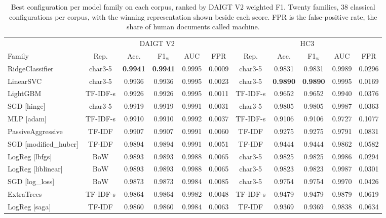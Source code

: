 \documentclass[conference,a4paper]{IEEEtran}
\begin{document}
\begin{table}[!t]
\centering
\caption{Best configuration per model family on each corpus, ranked by DAIGT V2 weighted F1. Twenty families, 38 classical configurations per corpus, with the winning representation shown beside each score. FPR is the false-positive rate, the share of human documents called machine.}
\label{tab:families}
\footnotesize
\setlength{\tabcolsep}{4pt}
\begin{tabular}{@{}lccccc@{\hspace{10pt}}ccccc@{}}
\toprule
& \multicolumn{5}{c}{DAIGT V2} & \multicolumn{5}{c}{HC3} \\
\cmidrule(lr){2-6}\cmidrule(lr){7-11}
Family & Rep. & Acc. & F1$_\mathrm{w}$ & AUC & FPR & Rep. & Acc. & F1$_\mathrm{w}$ & AUC & FPR \\
\midrule
RidgeClassifier & char3-5 & \textbf{0.9941} & \textbf{0.9941} & 0.9995 & 0.0009 & char3-5 & 0.9831 & 0.9831 & 0.9989 & 0.0296 \\
LinearSVC & char3-5 & 0.9936 & 0.9936 & 0.9995 & 0.0023 & char3-5 & \textbf{0.9890} & \textbf{0.9890} & 0.9995 & 0.0169 \\
LightGBM & TF-IDF-s & 0.9926 & 0.9926 & 0.9995 & 0.0011 & TF-IDF-s & 0.9652 & 0.9652 & 0.9940 & 0.0376 \\
SGD [hinge] & char3-5 & 0.9919 & 0.9919 & 0.9991 & 0.0031 & char3-5 & 0.9805 & 0.9805 & 0.9987 & 0.0363 \\
MLP [adam] & TF-IDF-s & 0.9910 & 0.9910 & 0.9992 & 0.0037 & TF-IDF-s & 0.9106 & 0.9106 & 0.9727 & 0.1077 \\
PassiveAggressive & TF-IDF & 0.9907 & 0.9907 & 0.9991 & 0.0060 & TF-IDF & 0.9275 & 0.9275 & 0.9791 & 0.0831 \\
SGD [modified\_huber] & TF-IDF & 0.9894 & 0.9894 & 0.9991 & 0.0051 & TF-IDF & 0.9444 & 0.9444 & 0.9862 & 0.0582 \\
LogReg [lbfgs] & BoW & 0.9893 & 0.9893 & 0.9988 & 0.0065 & char3-5 & 0.9825 & 0.9825 & 0.9986 & 0.0294 \\
LogReg [liblinear] & BoW & 0.9893 & 0.9893 & 0.9988 & 0.0065 & char3-5 & 0.9823 & 0.9823 & 0.9987 & 0.0301 \\
SGD [log\_loss] & BoW & 0.9873 & 0.9873 & 0.9984 & 0.0085 & char3-5 & 0.9754 & 0.9754 & 0.9970 & 0.0426 \\
ExtraTrees & TF-IDF-s & 0.9864 & 0.9864 & 0.9982 & 0.0048 & TF-IDF-s & 0.9479 & 0.9479 & 0.9879 & 0.0619 \\
LogReg [saga] & TF-IDF & 0.9860 & 0.9860 & 0.9984 & 0.0063 & TF-IDF & 0.9369 & 0.9369 & 0.9838 & 0.0634 \\

\end{tabular}
\end{table}
\end{document}
